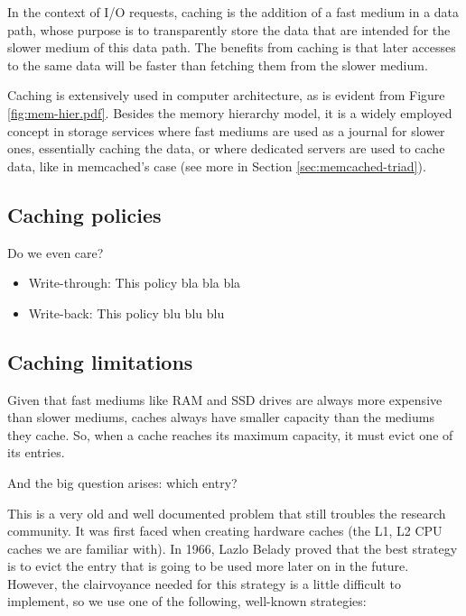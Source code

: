 In the context of I/O requests, caching is the addition of a fast medium in a 
data path, whose purpose is to transparently store the data that are intended 
for the slower medium of this data path. The benefits from caching is that 
later accesses to the same data will be faster than fetching them from the 
slower medium.

Caching is extensively used in computer architecture, as is evident from Figure 
\ref{fig:mem-hier.pdf}. Besides the memory hierarchy model, it is a widely 
employed concept in storage services where fast mediums are used as a journal 
for slower ones, essentially caching the data, or where dedicated servers are 
used to cache data, like in memcached's case (see more in Section 
\ref{sec:memcached-triad}).

\subsection{Caching policies}

Do we even care?

\begin{itemize}
	\item Write-through:
		This policy bla bla bla
	\item Write-back:
		This policy blu blu blu
\end{itemize}

\subsection{Caching limitations}

Given that fast mediums like RAM and SSD drives are always more expensive than 
slower mediums, caches always have smaller capacity than the mediums they 
cache. So, when a cache reaches its maximum capacity, it must evict one of its 
entries. 

And the big question arises: which entry?

This is a very old and well documented problem that still troubles the research 
community. It was first faced when creating hardware caches (the L1, L2 CPU 
caches we are familiar with). In 1966, Lazlo Belady proved that the best 
strategy is to evict the entry that is going to be used more later on in the 
future\cite{Belady}.  However, the clairvoyance needed for this strategy is a 
little difficult to implement, so we use one of the following, well-known 
strategies:

